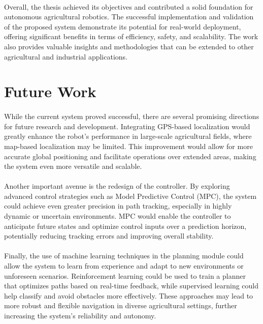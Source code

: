 \paragraph{}Overall, the thesis achieved its objectives and contributed a solid foundation for autonomous agricultural robotics. The successful implementation and validation of the proposed system demonstrate its potential for real-world deployment, offering significant benefits in terms of efficiency, safety, and scalability. The work also provides valuable insights and methodologies that can be extended to other agricultural and industrial applications.


\section{Future Work}
\label{sec:future_work}
\paragraph{}While the current system proved successful, there are several promising directions for future research and development. Integrating GPS-based localization would greatly enhance the robot's performance in large-scale agricultural fields, where map-based localization may be limited. This improvement would allow for more accurate global positioning and facilitate operations over extended areas, making the system even more versatile and scalable.

\paragraph{}Another important avenue is the redesign of the controller. By exploring advanced control strategies such as Model Predictive Control (MPC), the system could achieve even greater precision in path tracking, especially in highly dynamic or uncertain environments. MPC would enable the controller to anticipate future states and optimize control inputs over a prediction horizon, potentially reducing tracking errors and improving overall stability.

\paragraph{}Finally, the use of machine learning techniques in the planning module could allow the system to learn from experience and adapt to new environments or unforeseen scenarios. Reinforcement learning could be used to train a planner that optimizes paths based on real-time feedback, while supervised learning could help classify and avoid obstacles more effectively. These approaches may lead to more robust and flexible navigation in diverse agricultural settings, further increasing the system's reliability and autonomy.

